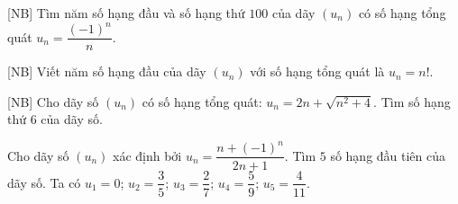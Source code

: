 \begin{bt}%
[NB]%
	Tìm năm số hạng đầu và số hạng thứ $100$ của dãy $(u_n)$ có số hạng tổng quát $u_n= \dfrac{(-1)^n}{n}$.
\end{bt}

\begin{bt}%
[NB]%
	Viết năm số hạng đầu của dãy $(u_n)$ với số hạng tổng quát là $u_n=n!$.
\end{bt}

\begin{bt}%
[NB]
	Cho dãy số $(u_n)$ có số hạng tổng quát: $u_n=2 n+\sqrt{n^2+4}$. Tìm số hạng thứ $6$ của dãy số.
\end{bt}

\begin{bt}%
	Cho dãy số $(u_n)$ xác định bởi $u_n=\dfrac{n+(-1)^n}{2n+1}$. Tìm $5$ số hạng đầu tiên của dãy số.
	\loigiai 
	{
	Ta có $u_1=0$; $u_2=\dfrac{3}{5}$; $u_3=\dfrac{2}{7}$; $u_4=\dfrac{5}{9}$; $u_5=\dfrac{4}{11}$.
}
\end{bt}

